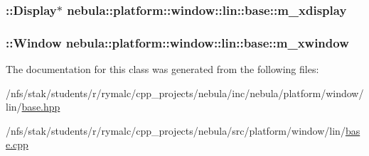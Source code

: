 \label{classnebula_1_1platform_1_1window_1_1lin_1_1base_ad43cdc274bbb7e66479814e98887880b}
\hypertarget{classnebula_1_1platform_1_1window_1_1lin_1_1base_a06a95115e359f15e213bd0b8c3234526}{
\subsubsection[{m\_\-xdisplay}]{\setlength{\rightskip}{0pt plus 5cm}::Display$\ast$ {\bf nebula::platform::window::lin::base::m\_\-xdisplay}}}
\label{classnebula_1_1platform_1_1window_1_1lin_1_1base_a06a95115e359f15e213bd0b8c3234526}
\hypertarget{classnebula_1_1platform_1_1window_1_1lin_1_1base_aca6ba787d38d9383b56d5844b4f53843}{
\subsubsection[{m\_\-xwindow}]{\setlength{\rightskip}{0pt plus 5cm}::Window {\bf nebula::platform::window::lin::base::m\_\-xwindow}}}
\label{classnebula_1_1platform_1_1window_1_1lin_1_1base_aca6ba787d38d9383b56d5844b4f53843}


The documentation for this class was generated from the following files:\begin{DoxyCompactItemize}
\item 
/nfs/stak/students/r/rymalc/cpp\_\-projects/nebula/inc/nebula/platform/window/lin/\hyperlink{inc_2nebula_2platform_2window_2lin_2base_8hpp}{base.hpp}\item 
/nfs/stak/students/r/rymalc/cpp\_\-projects/nebula/src/platform/window/lin/\hyperlink{src_2platform_2window_2lin_2base_8cpp}{base.cpp}\end{DoxyCompactItemize}
